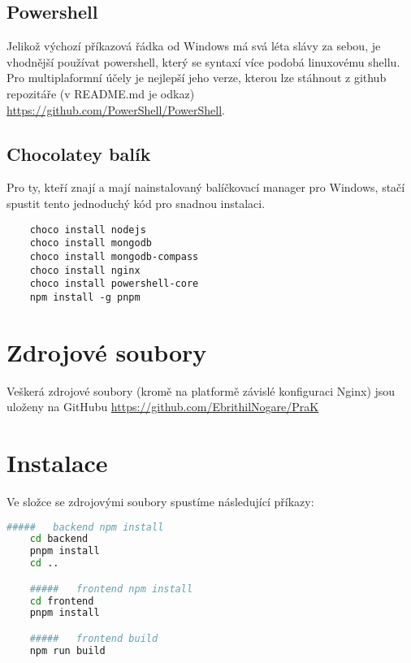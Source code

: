 \subsection{Powershell}
Jelikož výchozí příkazová řádka od Windows má svá léta slávy za sebou, je
vhodnější používat powershell, který se syntaxí více podobá linuxovému shellu.
Pro multiplaformní účely je nejlepší jeho  verze, kterou lze stáhnout
z github repozitáře (v README.md je odkaz) \url{https://github.com/PowerShell/PowerShell}.

\subsection{Chocolatey balík}
Pro ty, kteří znají a mají nainstalovaný balíčkovací manager  pro Windows, 
stačí spustit tento jednoduchý kód pro snadnou instalaci.
\begin{lstlisting}
	choco install nodejs
	choco install mongodb
	choco install mongodb-compass
	choco install nginx
	choco install powershell-core
	npm install -g pnpm
\end{lstlisting}

\section{Zdrojové soubory}
Veškerá zdrojové soubory (kromě na platformě závislé konfiguraci Nginx)
jsou uloženy na GitHubu \url{https://github.com/EbrithilNogare/PraK}

\section{Instalace}
Ve složce se zdrojovými soubory spustíme následující příkazy:
\begin{lstlisting}[language=bash]
	#####   backend npm install
	cd backend
	pnpm install
	cd ..

	#####   frontend npm install
	cd frontend
	pnpm install

	#####   frontend build
	npm run build
\end{lstlisting}

